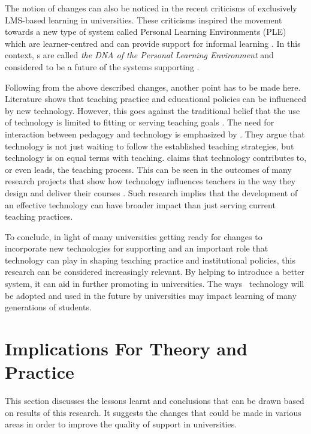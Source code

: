 The notion of changes can also be noticed in the recent criticisms of
exclusively LMS-based learning in universities. These criticisms inspired the
movement towards a new type of system called Personal Learning Environments
(PLE) which are learner-centred and can provide support for informal learning
\citep{Calvani2007}. In this context, \ep s are called \textit{the DNA of the
Personal Learning Environment} and considered to be a future of the systems
supporting \LLLs \citet{Attwell2007a}.

Following from the above described changes, another point has to be made here.
Literature shows that teaching practice and educational policies can be
influenced by new technology. However, this goes against the traditional belief
that the use of technology is limited to fitting or serving teaching goals
\citep{Levin2008}. The need for interaction between pedagogy and technology is
emphasized by \citet{Savin-Baden2006}. They argue that technology is not just
waiting to follow the established teaching strategies, but technology is on
equal terms with teaching. \citet{Cousin2005} claims that technology contributes
to, or even leads, the teaching process. This can be seen in the outcomes of
many research projects that show how technology influences teachers in the way
they design and deliver their courses \citep{Rutledge2012,Wang2002}. Such
research implies that the development of an effective technology can have
broader impact than just serving current teaching practices.

To conclude, in light of many universities getting ready for changes to
incorporate new technologies for supporting \LLLs and an important role that
technology can play in shaping teaching practice and institutional policies,
this research can be considered increasingly relevant. By helping to introduce a
better system, it can aid in further promoting \LLLs in universities. The ways
\ep~technology will be adopted and used in the future by universities may impact
learning of many generations of students.

\section{Implications For Theory and Practice}

This section discusses the lessons learnt and conclusions that can be drawn
based on results of this research. It suggests the changes that could be made in
various areas in order to improve the quality of \LLLs support in universities.

